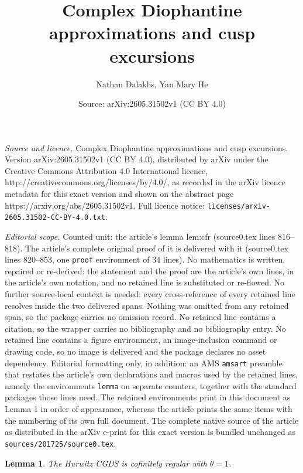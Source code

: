 \documentclass[10pt,a4paper]{amsart}
\title{Complex Diophantine approximations and cusp excursions}
\author{Nathan Dalaklis, Yan Mary He}
\date{Source: arXiv:2605.31502v1 (CC BY 4.0)}
\newtheorem{lemma}{Lemma}
\begin{document}
\maketitle

\noindent\emph{Source and licence.} Complex Diophantine approximations and cusp excursions. Version arXiv:2605.31502v1 (CC BY 4.0), distributed by arXiv under the Creative Commons Attribution 4.0 International licence, http://creativecommons.org/licenses/by/4.0/, as recorded in the arXiv licence metadata for this exact version and shown on the abstract page https://arxiv.org/abs/2605.31502v1. Full licence notice: \texttt{licenses/arxiv-2605.31502-CC-BY-4.0.txt}.\par\smallskip

\noindent\textit{Editorial scope.} Counted unit: the article's lemma lem:cfr (source0.tex lines 816--818). The article's complete original proof of it is delivered with it (source0.tex lines 820--853, one \texttt{proof} environment of 34 lines). No mathematics is written, repaired or re-derived: the statement and the proof are the article's own lines, in the article's own notation, and no retained line is substituted or re-flowed.  No further source-local context is needed: every cross-reference of every retained line resolves inside the two delivered spans.  Nothing was omitted from any retained span, so the package carries no omission record.  No retained line contains a citation, so the wrapper carries no bibliography and no bibliography entry.  No retained line contains a figure environment, an image-inclusion command or drawing code, so no image is delivered and the package declares no asset dependency.  Editorial formatting only, in addition: an AMS \texttt{amsart} preamble that restates the article's own declarations and macros used by the retained lines, namely the environments \texttt{lemma} on separate counters, together with the standard packages those lines need.  The retained environments print in this document as Lemma 1 in order of appearance, whereas the article prints the same items with the numbering of its own full document.  The complete native source of the article as distributed in the arXiv e-print for this exact version is bundled unchanged as \texttt{sources/201725/source0.tex}.
\begin{lemma}\label{lem:cfr}
    The Hurwitz CGDS is cofinitely regular with $\theta = 1$.
\end{lemma} 
\end{document}
